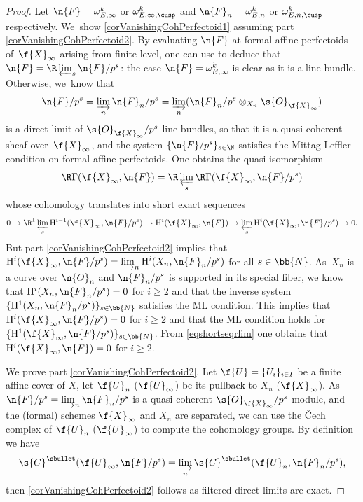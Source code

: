 \begin{proof}
Let $\n{F}= \omega^k_{E,\infty}$ or $\omega^{k}_{E,\infty,\cusp}$ and $\n{F}_n=\omega^k_{E,n}$ or $\omega^k_{E,n,\cusp}$ respectively. We~show \eqref{corVanishingCohPerfectoid1} assuming part \eqref{corVanishingCohPerfectoid2}. By evaluating $\n{F}$ at formal affine perfectoids of~$\f{X}_{\infty}$ arising from finite level, one can use \cite[Lem.\,3.18]{MR3090230} to deduce that $\n{F}= \R\varprojlim_s \n{F}/p^s$: the case $\n{F}= \omega_{E,\infty}^k$ is clear as it is a line bundle. Otherwise, we~know that
\[
\n{F}/p^s=\varinjlim_n \n{F}_n/p^s=\varinjlim_n (\n{F}_n/p^s\otimes_{X_n}\s{O}_{\f{X}_{\infty}})
\]
is a direct limit of $\s{O}_{\f{X}_{\infty}}/p^s$-line bundles, so that it is a quasi-coherent sheaf over~$\f{X}_{\infty}$, and the system $\{\n{F}/p^s\}_{s\in \N}$ satisfies the Mittag-Leffler condition on formal affine perfectoids. One obtains the quasi-isomorphism
\[
\R\Gamma(\f{X}_{\infty}, \n{F})= \R\varprojlim_s \R\Gamma(\f{X}_{\infty}, \n{F}/p^s)
\]
whose cohomology translates into short exact sequences
\begin{equation}
\label{eqshortseqrlim}
0\to \R^1\varprojlim_s \mathrm{H}^{i-1}(\f{X}_{\infty}, \n{F}/p^s) \to \mathrm{H}^{i}(\f{X}_{\infty}, \n{F}) \to \varprojlim_{s} \mathrm{H}^{i}(\f{X}_{\infty}, \n{F}/p^s) \to 0.
\end{equation}
But part \eqref{corVanishingCohPerfectoid2} implies that $\mathrm{H}^i(\f{X}_{\infty}, \n{F}/p^s)= \varinjlim_{n} \mathrm{H}^i(X_n, \n{F}_n/p^s)$ for all $s\in \bb{N}$. As~$X_n$ is a curve over $\n{O}_n$ and $\n{F}_n/p^s$ is supported in its special fiber, we know that $ \mathrm{H}^i(X_n, \n{F}_n/p^s)=0$ for $i\geq 2$ and that the inverse system $\{\mathrm{H}^1(X_n, \n{F}_n/p^s)\}_{s\in \bb{N}}$ satisfies the ML condition. This implies that $\mathrm{H}^i(\f{X}_{\infty}, \n{F}/p^s)=0$ for $i\geq 2$ and that the ML condition holds for $\{\mathrm{H}^1(\f{X}_{\infty}, \n{F}/p^s)\}_{s\in \bb{N}}$. From \eqref{eqshortseqrlim} one obtains that $\mathrm{H}^i(\f{X}_{\infty}, \n{F})=0$ for $i\geq 2$.

We prove part \eqref{corVanishingCohPerfectoid2}. Let $\f{U}=\{U_i\}_{i\in I}$ be a finite affine cover of $X$, let $\f{U}_n$ (\resp $\f{U}_{\infty}$) be its pullback to $X_n$ (\resp $\f{X}_{\infty}$). As $\n{F}/p^s=\varinjlim_n \n{F}_n/p^s$ is a quasi-coherent $\s{O}_{\f{X}_{\infty}}/p^s$-module, and the (formal) schemes $\f{X}_{\infty}$ and $X_n$ are separated, we can use the \v{C}ech complex of $\f{U}_n$ (\resp $\f{U}_{\infty}$) to compute the cohomology groups. By definition we have
\[
\s{C}^{\sbullet}(\f{U}_{\infty}, \n{F}/p^s) = \varinjlim_n \s{C}^{\sbullet}(\f{U}_n, \n{F}_n/p^s),
\]
then \eqref{corVanishingCohPerfectoid2} follows as filtered direct limits are exact.


\end{proof}
